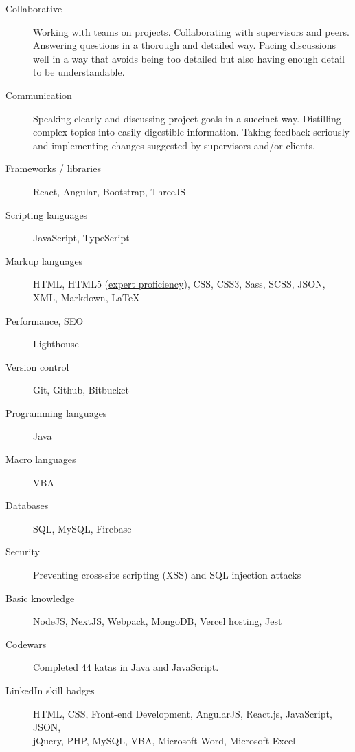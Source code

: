 \documentclass{article}
\begin{document}
\begin{description}
  \item [Collaborative] Working with teams on projects. Collaborating with supervisors and peers. Answering questions in a thorough and detailed way. Pacing discussions well in a way that avoids being too detailed but also having enough detail to be understandable.
  \item [Communication] Speaking clearly and discussing project goals in a succinct way. Distilling complex topics into easily digestible information. Taking feedback seriously and implementing changes suggested by supervisors and/or clients.
  \item [Frameworks / libraries] React, Angular, Bootstrap, ThreeJS
  \item [Scripting languages] JavaScript, TypeScript
  \item [Markup languages] HTML, HTML5 (\href{https://app.pluralsight.com/profile/alexander-koik-cesto}{expert proficiency}), CSS, CSS3, Sass, SCSS, JSON, XML, Markdown, LaTeX
  \item [Performance, SEO] Lighthouse
  \item [Version control] Git, Github, Bitbucket
  \item [Programming languages] Java
  \item [Macro languages] VBA
  \item [Databases] SQL, MySQL, Firebase
  \item [Security] Preventing cross-site scripting (XSS) and SQL injection attacks
  \item [Basic knowledge] NodeJS, NextJS, Webpack, MongoDB, Vercel hosting, Jest
  \item [Codewars] Completed \href{https://www.codewars.com/users/sirkoik}{44 katas} in Java and JavaScript.
  \item [LinkedIn skill badges] HTML, CSS, Front-end Development, AngularJS, React.js, JavaScript, JSON,\\ jQuery, PHP, MySQL, VBA, Microsoft Word, Microsoft Excel
\end{description}

\end{document}
